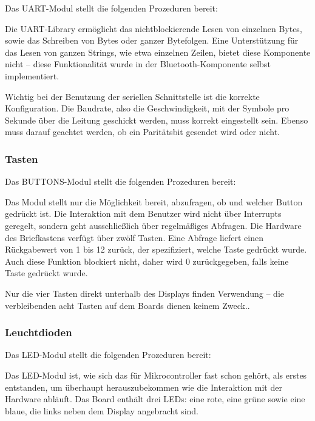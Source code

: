 \documentclass[ngerman]{article}
\begin{document}
Das UART-Modul stellt die folgenden Prozeduren bereit:



Die UART-Library ermöglicht das nichtblockierende Lesen von einzelnen Bytes,
sowie das Schreiben von Bytes oder ganzer Bytefolgen. Eine Unterstützung für
das Lesen von ganzen Strings, wie etwa einzelnen Zeilen, bietet diese Komponente
nicht -- diese Funktionalität wurde in der Bluetooth-Komponente selbst implementiert.

Wichtig bei der Benutzung der seriellen Schnittstelle ist die korrekte Konfiguration.
Die Baudrate, also die Geschwindigkeit, mit der Symbole pro Sekunde über die Leitung
geschickt werden, muss korrekt eingestellt sein. Ebenso muss darauf geachtet werden, ob
ein Paritätsbit gesendet wird oder nicht.

\subsubsection{Tasten}

Das BUTTONS-Modul stellt die folgenden Prozeduren bereit:



Das Modul stellt nur die Möglichkeit bereit, abzufragen, ob und welcher Button gedrückt ist.
Die Interaktion mit dem Benutzer wird nicht über Interrupts geregelt, sondern geht 
ausschließlich über regelmäßiges Abfragen. Die Hardware des Briefkastens verfügt über zwölf Tasten.
Eine Abfrage liefert einen Rückgabewert von 1 bis 12 zurück, der spezifiziert,
welche Taste gedrückt wurde. Auch diese Funktion blockiert nicht, daher
wird 0 zurückgegeben, falls keine Taste gedrückt wurde.

Nur die vier Tasten direkt unterhalb des Displays finden Verwendung -- 
die verbleibenden acht Tasten auf dem Boards dienen keinem Zweck..

\subsubsection{Leuchtdioden}

Das LED-Modul stellt die folgenden Prozeduren bereit:



Das LED-Modul ist, wie sich das für Mikrocontroller fast schon gehört, als
erstes entstanden, um überhaupt herauszubekommen wie die Interaktion mit
der Hardware abläuft. Das Board enthält drei LEDs: eine rote, eine grüne
sowie eine blaue, die links neben dem Display angebracht sind.
\end{document}
